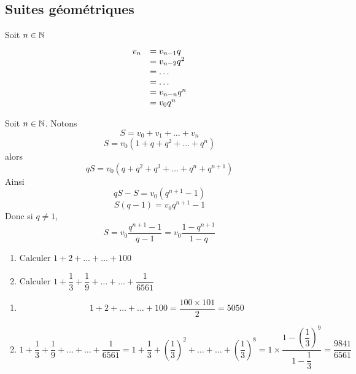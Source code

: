 \subsection{Suites géométriques}
\newline


\newline

\begin{preuve}
Soit $n\in\mathbb{N}$
$$\begin{array}{l l}
v_n & = v_{n-1}q\\
& = v_{n-2} q^2\\
& = \ldots\\
& = \ldots\\
& = v_{n-n}q^n\\
& = v_0q^n\\
\end{array}$$
\end{preuve}
\newline

\begin{preuve}
Soit $n\in \mathbb{N}$. Notons 
$$S = v_0 + v_1 + \ldots + v_n$$
$$S = v_0(1 + q + q^2 + \ldots + q^n)$$
alors 
$$qS = v_0(q + q^2 + q^3 + \ldots + q^n + q^{n+1})$$
Ainsi 
$$qS - S = v_0(q^{n+1} -1)$$
$$S(q - 1) = v_0q^{n+1} -1 $$
Donc si $q\neq 1$, 
$$S = v_0\dfrac{q^{n+1}-1}{q-1} = v_0\dfrac{1-q^{n+1}}{1-q}$$
\end{preuve}
\begin{exemples}
\begin{enumerate}
\item Calculer $1+2+\ldots+\ldots+100$
\item Calculer $1 + \dfrac{1}{3} + \dfrac{1}{9} + \ldots + \ldots + \dfrac{1}{6561}$
\end{enumerate}
\begin{enumerate}
\item $$1+2+\ldots+\ldots+100 = \dfrac{100\times101}{2} = 5050$$
\item $$1 + \dfrac{1}{3} + \dfrac{1}{9} + \ldots + \ldots + \dfrac{1}{6561} = 1 + \dfrac{1}{3} + \left(\dfrac{1}{3}\right)^2 + \ldots + \ldots + \left(\dfrac{1}{3}\right)^8 = 1\times \dfrac{1 - \left(\dfrac{1}{3}\right)^9}{1-\dfrac{1}{3}} = \dfrac{9841}{6561}$$
\end{enumerate}
\end{exemples}
